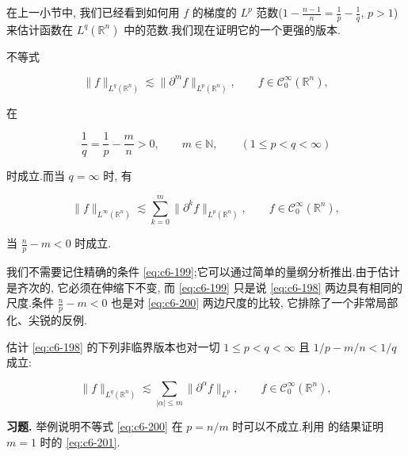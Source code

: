 在上一小节中, 我们已经看到如何用 $f$ 的梯度的 $L^p$ 范数($1 - \frac{n-1}{n} = \frac{1}{p} - \frac{1}{q}$, $p>1$)来估计函数在 $L^q(\mathbb{R}^n)$ 中的范数.我们现在证明它的一个更强的版本.

\begin{theorem}\label{thm:c6-2.11}
不等式

\begin{equation}
\|f\|_{L^q(\mathbb{R}^n)} \lesssim \|\partial^m f\|_{L^p(\mathbb{R}^n)}, \qquad f\in\mathcal{C}_0^\infty(\mathbb{R}^n), \label{eq:c6-198}
\end{equation}

在

\begin{equation}
\frac{1}{q} = \frac{1}{p} - \frac{m}{n} > 0, \qquad m\in\mathbb{N}, \qquad (1\le p < q < \infty)\label{eq:c6-199}
\end{equation}

时成立.而当 $q=\infty$ 时, 有

\begin{equation}
\|f\|_{L^\infty(\mathbb{R}^n)} \lesssim \sum_{k=0}^m\|\partial^k f\|_{L^p(\mathbb{R}^n)}, \qquad f\in\mathcal{C}_0^\infty(\mathbb{R}^n), \label{eq:c6-200}
\end{equation}

当 $\frac{n}{p} - m < 0$ 时成立.
\end{theorem}

\begin{remark*}
我们不需要记住精确的条件 \eqref{eq:c6-199};它可以通过简单的量纲分析推出.由于估计是齐次的, 它必须在伸缩下不变, 而 \eqref{eq:c6-199} 只是说 \eqref{eq:c6-198} 两边具有相同的尺度.条件 $\frac{n}{p}-m<0$ 也是对 \eqref{eq:c6-200} 两边尺度的比较, 它排除了一个非常局部化、尖锐的反例.
\end{remark*}

\begin{remark*}
估计 \eqref{eq:c6-198} 的下列非临界版本也对一切 $1\le p<q<\infty$ 且 $1/p - m/n < 1/q$ 成立:

\begin{equation}
\|f\|_{L^q(\mathbb{R}^n)} \lesssim \sum_{|\alpha|\le m}\|\partial^\alpha f\|_{L^p}, \qquad f\in\mathcal{C}_0^\infty(\mathbb{R}^n), \label{eq:c6-201}
\end{equation}
\end{remark*}

\textbf{习题.} 举例说明不等式 \eqref{eq:c6-200} 在 $p = n/m$ 时可以不成立.利用 的结果证明 $m=1$ 时的 \eqref{eq:c6-201}.


